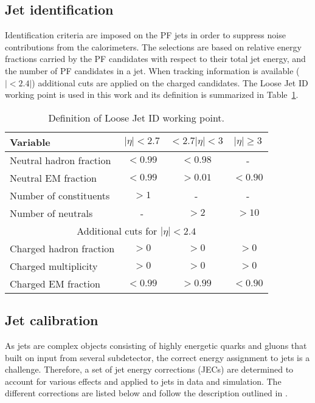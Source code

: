 \subsection*{Jet identification}
\noindent\justify
Identification criteria are imposed on the PF jets in order to suppress noise contributions from the calorimeters. 
The selections are based on relative energy fractions carried by the PF candidates with respect to their total jet energy, and the number of PF candidates in a jet. 
When tracking information is available ($|<2.4|$) additional cuts are applied on the charged candidates.  
The Loose Jet ID working point is used in this work and its definition is summarized in Table~\ref{tab:jetId}. 
\begin{table}[ht!]
\def\arraystretch{1.2}
    \caption{Definition of Loose Jet ID working point.}
    \label{tab:jetId}
    \begin{center}
        \begin{tabular}{ l c c c }
        \hline \hline
        Variable               &  $|\eta|<2.7$&  $<2.7|\eta|<3$ &  $|\eta|\geq3$     \\ \hline
        Neutral hadron fraction & $<0.99$   & $<0.98$  & -      \\
        Neutral EM fraction & $<0.99$   & $>0.01$  & $<0.90$      \\
        Number of constituents & $>1$    & -  & -      \\
        Number of neutrals & -    & $>2$  & $>10$      \\
        \multicolumn{4}{c}{Additional cuts for $|\eta|<2.4$}                \\
        Charged hadron fraction & $>0$   & $>0$  & $>0$      \\
        Charged multiplicity & $>0$   & $>0$  & $>0$      \\
        Charged EM fraction & $<0.99$   & $>0.99$  & $<0.90$      \\
\hline\hline
\end{tabular}
\end{center}
\end{table}                                                                                                   
\subsection*{Jet calibration}\label{sec:JEC}
\noindent\justify
As jets are complex objects consisting of highly energetic quarks and gluons that built on input from several subdetector, the correct energy assignment to jets is a challenge. 
Therefore, a set of jet energy corrections (JECs) are determined to account for various effects and applied to jets in data and simulation. 
The different corrections are listed below and follow the description outlined in \cite{Khachatryan:2016kdb}. 
